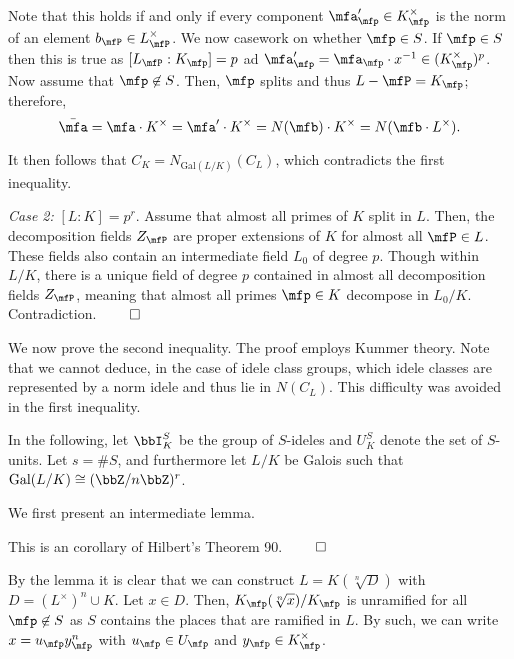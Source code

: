 \documentclass[a4paper, 12pt,oneside,openany]{book}
\begin{document}
Note that this holds if and only if every component $\mfa_\mfp' \in K_\mfp^\times$ is the norm of an element $b_\mfP \in L_\mfP^\times$. We now casework on whether $\mfp \in S$. If $\mfp \in S$ then this is true as $[L_\mfP:K_\mfp] = p$ ad $\mfa_\mfp' = \mfa_\mfp\cdot x^{-1} \in (K_\mfp^\times)^p$. Now assume that $\mfp \not\in S$. Then, $\mfp$ splits and thus $L-\mfP=K_\mfp$; therefore, $$\bar{\mfa} = \mfa \cdot K^\times = \mfa' \cdot K^\times = N(\mfb) \cdot K^\times = N(\mfb \cdot L^\times).$$

It then follows that $C_K = N_{\text{Gal}(L/K)}(C_L)$, which contradicts the first inequality. 

\emph{Case 2:} $[L:K] = p^r$. Assume that almost all primes of $K$ split in $L$. Then, the decomposition fields $Z_\mfP$ are proper extensions of $K$ for almost all $\mfP \in L$. These fields also contain an intermediate field $L_0$ of degree $p$. Though within $L/K$, there is a unique field of degree $p$ contained in almost all decomposition fields $Z_\mfP$, meaning that almost all primes $\mfp \in K$ decompose in $L_0/K$. Contradiction. $\qed$

We now prove the second inequality. The proof employs Kummer theory. Note that we cannot deduce, in the case of idele class groups, which idele classes are represented by a norm idele and thus lie in $N(C_L)$. This difficulty was avoided in the first inequality.

In the following, let $\bbI_K^S$ be the group of $S$-ideles and $U_K^S$ denote the set of $S$-units. Let $s = \#S$, and furthermore let $L/K$ be Galois such that $\text{Gal}(L/K) \cong (\bbZ/n\bbZ)^r$.


 We first present an intermediate lemma. 


 This is an corollary of Hilbert's Theorem 90. $\qed$

By the lemma it is clear that we can construct $L= K(\sqrt[n]{D})$ with $D = (L^\times)^n \cup K$. Let $x \in D$. Then, $K_\mfp(\sqrt[n]{x})/K_\mfp$ is unramified for all $\mfp \not\in S$ as $S$ contains the places that are ramified in $L$. By such, we can write $x = u_\mfp y_\mfp^n$ with $u_\mfp \in U_\mfp$ and $y_\mfp \in K_\mfp^\times$. 
\end{document}
